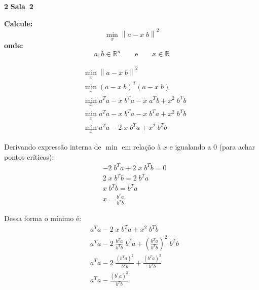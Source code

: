 \documentclass{article}
\newcommand{\R}{\mathbb{R}}
\newenvironment{question}
    {\medskip\bfseries\large}
    {\medskip}
\newcounter{exe-list}
\newenvironment{exe}[2][Sala]
    {\bigskip\noindent\par\ifthenelse{\equal{#1}{}}%
        {\textbf{\LARGE #2}}%
        {\textbf{\LARGE #1~#2}}%
    \medskip\noindent\par}
    {\bigskip}
\begin{document}
\begin{exe}{2}
    \begin{question}
        Calcule:
        \[
            \min_x \left\|
                a - x \; b
            \right\|^2
        \]
        onde:
        \[
            a, b \in \R^n
            \qquad\text{e}\qquad
            x \in \R
        \]
    \end{question}

    \begin{align*}
        &\min_x \left\| a - x \; b \right\|^2 \\
        &\min_x (a - x \; b)^T (a - x \; b) \\
        &\min_x a^T a - x \; b^T a - x \; a^T b + x^2 \; b^T b \\
        &\min_x a^T a - x \; b^T a - x \; b^T a + x^2 \; b^T b \\
        &\min_x a^T a - 2 \; x \; b^T a + x^2 \; b^T b
    \end{align*}

    Derivando expressão interna de \(\min\) em relação à \(x\)
    e igualando a \(0\) (para achar pontos críticos):
    \begin{align*}
        &- 2 \; b^T a + 2 \; x \; b^T b = 0 \\
        &2 \; x \; b^T b = 2 \; b^T a \\
        &x \; b^T b = b^T a \\
        &x = \frac{b^T a}{b^T b}
    \end{align*}

    Dessa forma o mínimo é:
    \begin{align*}
        &a^T a - 2 \; x \; b^T a + x^2 \; b^T b \\
        &a^T a - 2 \; \frac{b^T a}{b^T b} \; b^T a
            + \left(\frac{b^T a}{b^T b}\right)^2 \; b^T b \\
        &a^T a - 2 \; \frac{(b^T a)^2}{b^T b}
            + \frac{(b^T a)^2}{b^T b} \\
        &a^T a - \frac{(b^T a)^2}{b^T b} \\
    \end{align*}
\end{exe}
\end{document}
